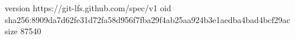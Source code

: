 version https://git-lfs.github.com/spec/v1
oid sha256:8909da7d62fe31d72fa58d956f7fba29f4ab25aa924b3e1aedba4bad4bcf29ac
size 87540
